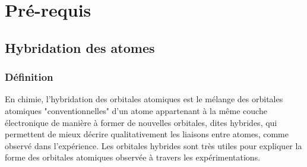 \chapter{Pré-requis}
\minitoc
\section{Hybridation des atomes}
\subsection{Définition}
En chimie, l'hybridation des orbitales atomiques est le mélange des orbitales atomiques "conventionnelles" d'un atome appartenant à la même couche électronique de manière à former de nouvelles orbitales, dites hybrides, qui permettent de mieux décrire qualitativement les liaisons entre atomes, comme observé dans l'expérience. Les orbitales hybrides sont très utiles pour expliquer la forme des orbitales atomiques observée à travers les expérimentations.
